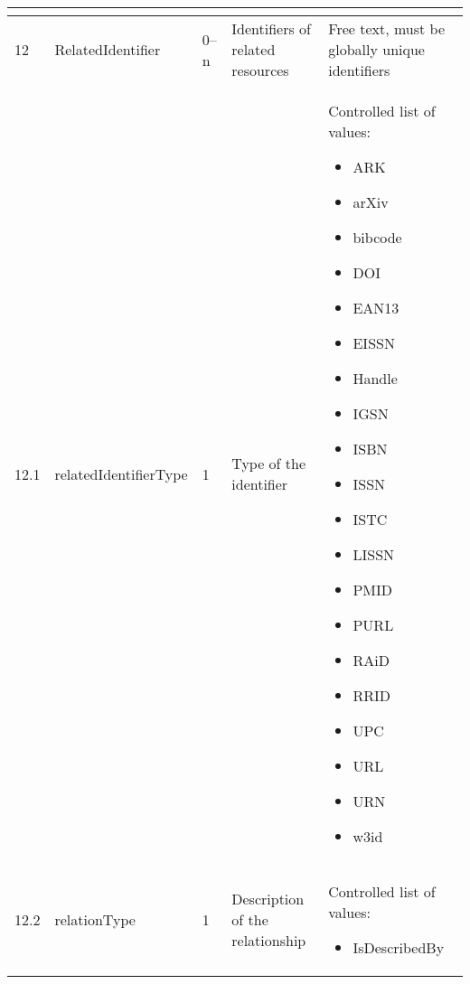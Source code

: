\documentclass[titlepage=true,twoside=false,DIV=13]{scrartcl}
\begin{document}
\begin{longtable}{|l|l|l|p{}|p{\valcolw}|}
\begin{minipage}[t]{\valcolw}
\begin{itemize}[nosep,leftmargin=3.5ex]
            \end{itemize}
            \vspace{1ex}
          \end{minipage} \\
  \hline
  12    & RelatedIdentifier            & 0--n
        & Identifiers of related resources
        & Free text, must be globally unique identifiers \\
  \hline
  12.1  & relatedIdentifierType        & 1
        & Type of the identifier
        & \begin{minipage}[t]{\valcolw}
            Controlled list of values:
            \begin{itemize}[nosep,leftmargin=3.5ex]
            \item ARK
            \item arXiv
            \item bibcode
            \item DOI
            \item EAN13
            \item EISSN
            \item Handle
            \item IGSN
            \item ISBN
            \item  ISSN
            \item ISTC
            \item LISSN
            \item PMID
            \item PURL
            \item RAiD
            \item RRID
            \item UPC
            \item URL
            \item URN
            \item w3id
            \end{itemize}
            \vspace{1ex}
          \end{minipage} \\
  \hline
  12.2  & relationType                 & 1
        & Description of the relationship
        & \begin{minipage}[t]{\valcolw}
            Controlled list of values:
            \begin{itemize}[nosep,leftmargin=3.5ex]
            \item IsDescribedBy

\end{itemize}
\end{minipage}
\end{longtable}
\end{document}
